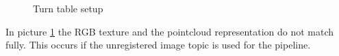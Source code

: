 \documentclass[main.tex]{subfiles}
\begin{document}
		\begin{figure}[H]
   			 \centering
   			 \caption{Turn table setup}
			  \label{turnTableOriginal}
  		\end{figure}
In picture \ref{turnTableOriginal} the RGB texture and the pointcloud representation do not match fully. This occurs if the unregistered image topic is used for the pipeline. 
\end{document}
